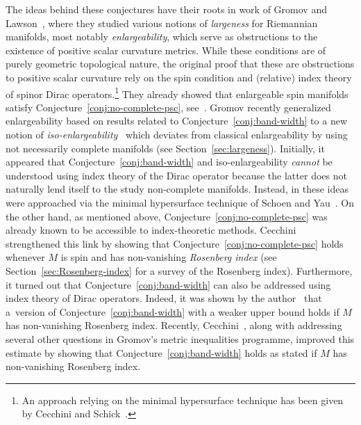 \documentclass[pdftex]{sigma}
\numberwithin{equation}{section}
\begin{document}
The ideas behind these conjectures have their roots in work of Gromov and Lawson~\mbox{\cite{gromov-lawson:spin-and-scalar-in-presence, GromovLawson:PSCDiracComplete}}, where they studied various notions of \emph{largeness} for Riemannian manifolds, most notably \emph{enlargeability}, which serve as obstructions to the existence of positive scalar curvature metrics.
While these conditions are of purely geometric topological nature, the original proof that these are obstructions to positive scalar curvature rely on the spin condition and (relative) index theory of spinor Dirac operators.\footnote{An approach relying on the minimal hypersurface technique has been given by Cecchini and Schick~\cite{CecchiniSchick:Enlargeable}.}
They already showed that enlargeable spin manifolds satisfy Conjecture~\ref{conj:no-complete-psc}, see~\cite[Section~6]{GromovLawson:PSCDiracComplete}.
Gromov recently generalized enlargeability based on results related to Conjecture~\ref{conj:band-width} to a new notion of \emph{iso-enlargeability}~\cite[Section~4]{Gromov:MetricInequalitiesScalar} which deviates from classical enlargeability by using not necessarily complete manifolds (see Section~\ref{sec:largeness}).
Initially, it appeared that Conjecture~\ref{conj:band-width} and iso-enlargeability \emph{cannot} be understood using index theory of the Dirac operator because the latter does not naturally lend itself to the study non-complete manifolds.
Instead, in \cite{Gromov:MetricInequalitiesScalar} these ideas were approached via the minimal hypersurface technique of Schoen and Yau~\cite{SchoenYau:HypersurfaceMethod}.
On the other hand, as mentioned above, Conjecture~\ref{conj:no-complete-psc} was already known to be accessible to index-theoretic methods.
Cecchini~\cite{Cecchini:CalliasTypePSC} strengthened this link by showing that Conjecture~\ref{conj:no-complete-psc} holds whenever \(M\) is spin and has non-vanishing \emph{Rosenberg index} (see Section~\ref{sec:Rosenberg-index} for a survey of the Rosenberg index).
Furthermore, it turned out that Conjecture~\ref{conj:band-width} can also be addressed using index theory of Dirac operators.
Indeed, it was shown by the author~\cite{Zeidler:band-width-estimates} that a~version of Conjecture~\ref{conj:band-width} with a weaker upper bound holds if \(M\) has non-vanishing Rosenberg index.
Recently, Cecchini~\cite{Cecchini:LongNeck}, along with addressing several other questions in Gromov's metric inequalities programme, improved this estimate by showing that Conjecture~\ref{conj:band-width} holds as stated if \(M\) has non-vanishing Rosenberg index.
\end{document}
